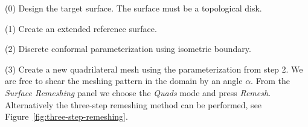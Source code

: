 \documentclass[Thesis.tex]{subfiles}
\begin{document}
\begin{compactenum}[(1)]

\item[(0)] Design the target surface. The surface must be a topological disk. 
\item[(1)] Create an extended reference surface.

\begin{center}
\begin{minipage}{\linewidth}
            \centering
\end{minipage}
\end{center}    

\item[(2)] Discrete conformal parameterization using isometric boundary. 

\begin{center}
\begin{minipage}{\linewidth}
            \centering
\end{minipage}
\end{center}    

\item[(3)] Create a new quadrilateral mesh using the parameterization from step 2. We are free to shear the meshing pattern in the domain by an angle $\alpha$. From the \emph{Surface Remeshing} panel we choose the \emph{Quads} mode and press \emph{Remesh}. Alternatively the three-step remeshing method can be performed, see Figure~\ref{fig:three-step-remeshing}.

\begin{center}
\begin{minipage}{\linewidth}
            \centering
\end{minipage}
\end{center}   


\end{compactenum}
\end{document}
